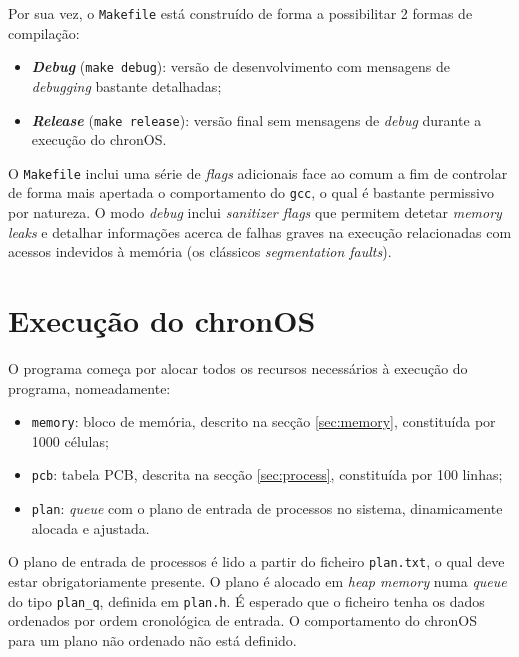 \documentclass[a4paper,11pt,onecolumn,oneside]{article}
\newcommand{\chronOS}{\textsf{chronOS}}
\begin{document}
	Por sua vez, o \texttt{Makefile} está construído de forma a possibilitar 2 formas de compilação:
	
	\begin{itemize}
		\item \textbf{\textit{Debug}} (\verb|make debug|): versão de desenvolvimento com mensagens de \textit{debugging} bastante detalhadas;
		
		\item \textbf{\textit{Release}} (\verb|make release|): versão final sem mensagens de \textit{debug} durante a execução do \chronOS.
	\end{itemize}

	O \texttt{Makefile} inclui uma série de \textit{flags} adicionais face ao comum a fim de controlar de forma mais apertada o comportamento do \texttt{\ac{gcc}}, o qual é bastante permissivo por natureza. O modo \textit{debug} inclui \textit{sanitizer flags} que permitem detetar \textit{memory leaks} e detalhar informações acerca de falhas graves na execução relacionadas com acessos indevidos à memória (os clássicos \textit{segmentation faults}).
	
	
	\section{Execução do \chronOS}
	\label{sec:main}
	
	O programa começa por alocar todos os recursos necessários à execução do programa, nomeadamente:
	
	\begin{itemize}
		\item \verb|memory|: bloco de memória, descrito na secção \ref{sec:memory}, constituída por 1000 células;
		\item \verb|pcb|: tabela PCB, descrita na secção \ref{sec:process}, constituída por 100 linhas;
		\item \verb|plan|: \textit{queue} com o plano de entrada de processos no sistema, dinamicamente alocada e ajustada.
	\end{itemize}

	O plano de entrada de processos é lido a partir do ficheiro \texttt{plan.txt}, o qual deve estar obrigatoriamente presente. O plano é alocado em \textit{heap memory} numa \textit{queue} do tipo \verb|plan_q|, definida em \verb|plan.h|. É esperado que o ficheiro tenha os dados ordenados por ordem cronológica de entrada. O comportamento do \chronOS~ para um plano não ordenado não está definido.
	
\end{document}
